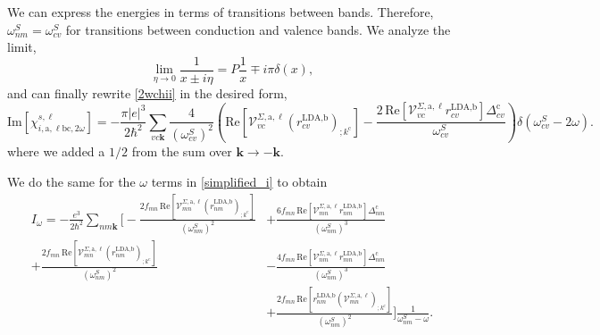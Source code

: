 We can express the energies in terms of transitions between bands. 
Therefore, $\omega^{S}_{nm} = \omega^{S}_{cv}$ for transitions between 
conduction and valence bands. We analyze the limit,
\begin{equation}\label{limit_eta}
\lim_{\eta\to 0}\frac{1}{x\pm i\eta}=P\frac{1}{x}\mp i\pi\delta(x),
\end{equation}
and can finally rewrite \eqref{2wchii} in the desired form,
\begin{equation}\label{imchi2w}
    \mathrm{Im}[\chi_{i,\text{a},\ell\text{b}\text{c},2\omega}^{s,\ell}] 
=   -\frac{\pi \vert e\vert^{3}}{2\hbar^2}\sum_{vc\mathbf{k}}
    \frac{4}{(\omega^{S}_{cv})^{2}}\left(\mathrm{Re}
    \left[\mathcal{V}^{\Sigma,\text{a},\ell}_{vc}
    \left(r^{\text{LDA,b}}_{cv}\right)_{;k^{\text{c}}}\right] 
-   \frac{2\,\mathrm{Re}\left[\mathcal{V}^{\Sigma,\text{a},\ell}_{vc}
    r^{\text{LDA,b}}_{cv}\right]\Delta^{\text{c}}_{cv}}{\omega^{S}_{cv}}\right)
    \delta(\omega^{S}_{cv}-2\omega)
.
\end{equation}
where we added a $1/2$ from the sum over $\mathbf{k} \rightarrow - \mathbf{k}$.

We do the same for the $\omega$ terms in \eqref{simplified_i} to obtain
\begin{align}\label{wchii}
I_{\omega}
= -\frac{e^3}{2\hbar^2}\sum_{nm\mathbf{k}}
\Biggl[
-   \frac{2f_{mn}\,\mathrm{Re}\left[\mathcal{V}^{\Sigma,\text{a},\ell}_{mn}
    \left(r^{\text{LDA,b}}_{nm}\right)_{;k^{\text{c}}}\right]}
    {(\omega^{S}_{nm})^{2}}
&+  \frac{6f_{mn}\,\mathrm{Re}\left[\mathcal{V}^{\Sigma,\text{a},\ell}_{mn}
    r^{\text{LDA,b}}_{nm}\right]\Delta^{\text{c}}_{nm}}{(\omega^{S}_{nm})^{3}}
    \nonumber\\
+   \frac{2f_{mn}\,\mathrm{Re}\left[\mathcal{V}^{\Sigma,\text{a},\ell}_{mn}
    \left(r^{\text{LDA,b}}_{nm}\right)_{;k^{\text{c}}}\right]}
    {(\omega^{S}_{nm})^{2}}
&-  \frac{4f_{mn}\,\mathrm{Re}\left[\mathcal{V}^{\Sigma,\text{a},\ell}_{nm}
    r^{\text{LDA,b}}_{mn}\right]\Delta_{nm}^{\text{c}}}{(\omega^{S}_{nm})^{3}}
    \nonumber\\
&+  \frac{2f_{mn}\,\mathrm{Re}\left[r^{\text{LDA,b}}_{nm}
    \left(\mathcal{V}^{\Sigma,\text{a},\ell}_{mn}\right)
    _{;k^{\text{c}}}\right]}{(\omega^{S}_{nm})^{2}}
\Biggr]\frac{1}{\omega^{S}_{nm}-\omega}
.
\end{align}


